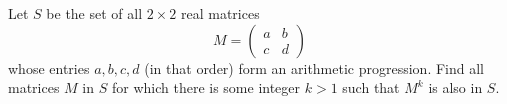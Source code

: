 Let $S$ be the set of all $2 \times 2$ real matrices
\[
M = \begin{pmatrix} a & b \\
c & d \end{pmatrix}
\]
whose entries $a,b,c,d$ (in that order) form an arithmetic progression. Find all matrices $M$ in $S$ for which there is some integer $k>1$ such that $M^k$ is also in $S$.
